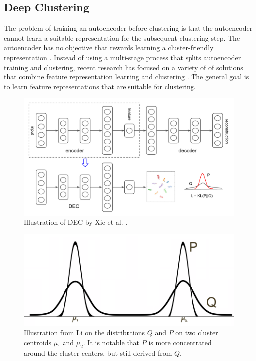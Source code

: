 \subsection{Deep Clustering} \label{Deep Clustering}

The problem of training an autoencoder before clustering is that the autoencoder cannot learn a suitable representation for the subsequent clustering step. The autoencoder has no objective that rewards learning a cluster-friendly representation \cite{dcn}. Instead of using a multi-stage process that splits autoencoder training and clustering, recent research has focused on a variety of of solutions that combine feature representation learning and clustering \cite{deep_clustering_survey}. The general goal is to learn feature representations that are suitable for clustering.

\begin{figure}
\centering
	\includegraphics[width=1\linewidth]{dec.png}
	\caption{Illustration of DEC by Xie et al. \cite{dec}.}
	\label{dec}
\end{figure}

\begin{figure}
\centering
	\includegraphics[width=0.7\linewidth]{p-and-q-distributions.png}
	\caption{Illustration from Li \cite{comparing_DEC_and_DCN} on the distributions $Q$ and $P$ on two cluster centroids $\mu_1$ and $\mu_2$. It is notable that $P$ is more concentrated around the cluster centers, but still derived from $Q$.}
	\label{p-and-q-distributions}
\end{figure}	

